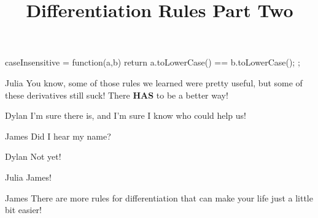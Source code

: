 \documentclass{ximera}
\title{Differentiation Rules Part Two}
\begin{document}
\maketitle
\begin{javascript}
 caseInsensitive = function(a,b) {
    return a.toLowerCase() == b.toLowerCase();
  };
\end{javascript}
\begin{dialogue}
\item[Julia] You know, some of those rules we learned were pretty useful, but some of these derivatives still suck! There \textbf{HAS} to be a better way!
\item[Dylan] I'm sure there is, and I'm sure I know who could help us!
\item[James] Did I hear my name?
\item[Dylan] Not yet!
\item[Julia] James!
\item[James] There are more rules for differentiation that can make your life just a little bit easier!
\end{dialogue}
\end{document}

